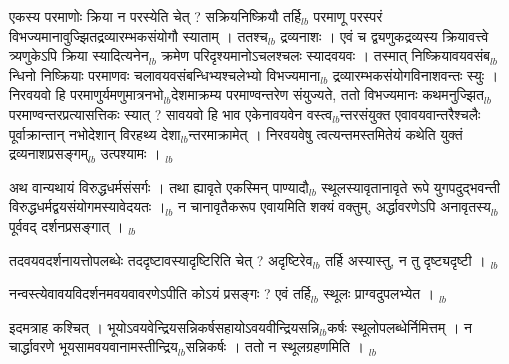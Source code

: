 \documentclass[article,12pt,a4paper]{memoir}%
\newcounter{parCount}
\begin{document}
	  \pstart \leavevmode%
	एकस्य परमाणोः क्रिया न परस्येति चेत् ? सक्रियनिष्क्रियौ तर्हि{\tiny $_{lb}$} परमाणू परस्परं विभज्यमानावुज्झितद्रव्यारम्भकसंयोगौ स्याताम् । ततश्च{\tiny $_{lb}$} द्रव्यनाशः । एवं च द्व्यणुकद्रव्यस्य क्रियावत्त्वे त्र्यणुकेऽपि क्रिया स्यादित्यनेन{\tiny $_{lb}$} क्रमेण परिदृश्यमानोऽचलश्चलः स्यादवयवः । तस्मात् निष्क्रियावयवसंब{\tiny $_{lb}$}न्धिनो निष्क्रियाः परमाणवः चलावयवसंबन्धिभ्यश्चलेभ्यो विभज्यमाना{\tiny $_{lb}$} द्रव्यारम्भकसंयोगविनाशवन्तः स्युः । निरवयवो हि परमाणुर्यमणुमात्रनभो{\tiny $_{lb}$}देशमाक्रम्य परमाण्वन्तरेण संयुज्यते, ततो विभज्यमानः कथमनुज्झित{\tiny $_{lb}$}परमाण्वन्तरप्रत्यासत्तिकः स्यात् ? सावयवो हि भाव एकेनावयवेन वस्त्व{\tiny $_{lb}$}न्तरसंयुक्त एवावयवान्तरैश्चलैः पूर्वाक्रान्तान् नभोदेशान् विरहथ्य देशा{\tiny $_{lb}$}न्तरमाक्रामेत् । निरवयवेषु त्वत्यन्तमस्तमितेयं कथेति युक्तं द्रव्यनाशप्रसङ्गम्{\tiny $_{lb}$} उत्पश्यामः ।
	{}
	\pend%
      {\tiny $_{lb}$}

	  \pstart \leavevmode%
	अथ वान्यथायं विरुद्धधर्मसंसर्गः । तथा ह्यावृते एकस्मिन् पाण्यादौ{\tiny $_{lb}$} स्थूलस्यावृतानावृते रूपे युगपदुद्भवन्ती विरुद्धधर्मद्वयसंयोगमस्यावेदयतः ।{\tiny $_{lb}$} न चानावृतैकरूप एवायमिति शक्यं वक्तुम्, अर्द्धावरणेऽपि अनावृतस्य{\tiny $_{lb}$} पूर्ववद् दर्शनप्रसङ्गात् ।
	{}
	\pend%
      {\tiny $_{lb}$}

	  \pstart \leavevmode%
	तदवयवदर्शनायत्तोपलब्धेः तददृष्टावस्यादृष्टिरिति चेत् ? अदृष्टिरेव{\tiny $_{lb}$} तर्हि अस्यास्तु, न तु दृष्ट्यदृष्टी ।
	{}
	\pend%
      {\tiny $_{lb}$}

	  \pstart \leavevmode%
	नन्वस्त्येवावयविदर्शनमवयवावरणेऽपीति कोऽयं प्रसङ्गः ? एवं तर्हि{\tiny $_{lb}$} स्थूलः प्राग्वदुपलभ्येत ।
	{}
	\pend%
      {\tiny $_{lb}$}

	  \pstart \leavevmode%
	इदमत्राह कश्चित् । भूयोऽवयवेन्द्रियसन्निकर्षसहायोऽवयवीन्द्रियसन्नि{\tiny $_{lb}$}कर्षः स्थूलोपलब्धेर्निमित्तम् । न चार्द्धावरणे भूयसामवयवानामस्तीन्द्रिय{\tiny $_{lb}$}सन्निकर्षः । ततो न स्थूलग्रहणमिति ।
	{}
	\pend%
      {\tiny $_{lb}$}
\end{document}
